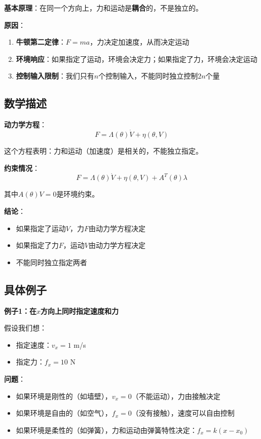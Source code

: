 \documentclass[12pt,a4paper]{article}
\begin{document}
\textbf{基本原理}：在同一个方向上，力和运动是\textbf{耦合}的，不是独立的。

\textbf{原因}：
\begin{enumerate}
\item \textbf{牛顿第二定律}：$F = ma$，力决定加速度，从而决定运动
\item \textbf{环境响应}：如果指定了运动，环境会决定力；如果指定了力，环境会决定运动
\item \textbf{控制输入限制}：我们只有$n$个控制输入，不能同时独立控制$2n$个量
\end{enumerate}

\subsection{数学描述}

\textbf{动力学方程}：
\begin{equation}
F = \Lambda(\theta)\dot{V} + \eta(\theta, V)
\end{equation}

这个方程表明：力和运动（加速度）是相关的，不能独立指定。

\textbf{约束情况}：
\begin{equation}
F = \Lambda(\theta)\dot{V} + \eta(\theta, V) + A^T(\theta)\lambda
\end{equation}

其中$A(\theta)V = 0$是环境约束。

\textbf{结论}：
\begin{itemize}
\item 如果指定了运动$V$，力$F$由动力学方程决定
\item 如果指定了力$F$，运动$V$由动力学方程决定
\item 不能同时独立指定两者
\end{itemize}

\subsection{具体例子}

\textbf{例子1：在$x$方向上同时指定速度和力}

假设我们想：
\begin{itemize}
\item 指定速度：$v_x = 1$ m/s
\item 指定力：$f_x = 10$ N
\end{itemize}

\textbf{问题}：
\begin{itemize}
\item 如果环境是刚性的（如墙壁），$v_x = 0$（不能运动），力由接触决定
\item 如果环境是自由的（如空气），$f_x = 0$（没有接触），速度可以自由控制
\item 如果环境是柔性的（如弹簧），力和运动由弹簧特性决定：$f_x = k(x - x_0)$
\end{itemize}
\end{document}
